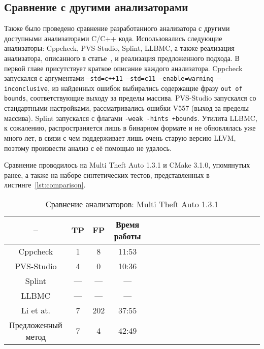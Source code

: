 \subsection{Сравнение с другими анализаторами}

Также было проведено сравнение разработанного анализатора с другими
доступными анализаторами C/C++ кода. Использовались следующие
анализаторы: Cppcheck, PVS-Studio, Splint, LLBMC, а
также реализация анализатора, описанного в
статье~\cite{li2010practical}, и реализация предложенного подхода. В
первой главе присутствует краткое описание каждого
анализатора. Cppcheck запускался с аргументами \texttt{--std=c++11
  --std=c11 --enable=warning --inconclusive}, из найденных ошибок
выбирались содержащие фразу \texttt{out of bounds}, соответствующие
выходу за пределы массива. PVS-Studio запускался со стандартными
настройками, рассматривались ошибки V557 (выход за пределы
массива). Splint запускался с флагами \texttt{-weak -hints
  +bounds}. Утилита LLBMC, к сожалению, распространяется лишь в
бинарном формате и не обновлялась уже много лет, в связи с чем
поддерживает лишь очень старую версию LLVM, поэтому произвести анализ
с её помощью не удалось.

Сравнение проводилось на Multi Theft Auto 1.3.1 и CMake 3.1.0,
упомянутых ранее, а также на наборе синтетических тестов,
представленных в листинге~\ref{lst:comparison}.

\begin{table}[!h]
\caption{Сравнение анализаторов: Multi Theft Auto 1.3.1}\label{tab:comparison-mta}
\centering
  \begin{tabular}{|*{18}{c|}}\hline
  --                 & TP  & FP  & Время работы \\\hline
  Cppcheck           & 1   & 8   & 11:53        \\\hline
  PVS-Studio         & 4   & 0   & 10:36        \\\hline
  Splint             & --- & --- & ---          \\\hline
  LLBMC              & --- & --- & ---          \\\hline
  Li et at.          & 7   & 202 & 37:55        \\\hline
  Предложенный метод & 7   & 4   & 42:49        \\\hline
  \end{tabular}
\end{table}

